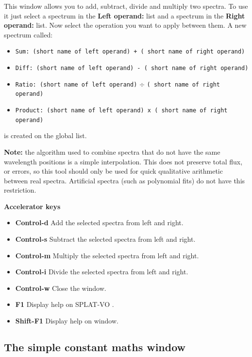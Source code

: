 \documentclass[twoside,11pt,nolof]{starlink}
\providecommand{\SPLAT}{\textsf{SPLAT-VO }}
\newcommand{\labelitem}[1]{\textbf{#1}}
\providecommand{\hitext}[1]{\texttt{#1}}
\providecommand{\subheading}[1]{\textbf{\large{#1}}}
\begin{document}
This window allows you to add, subtract, divide and multiply two spectra. To
use it just select a spectrum in the
\labelitem{Left operand:} list and a spectrum in the
\labelitem{Right operand:} list. Now select the operation you want to
apply between them. A new spectrum called:
\begin{itemize}
  \item \hitext{Sum: (short name of left operand) + ( short name of
        right operand)}
  \item \hitext{Diff: (short name of left operand) - ( short name of
        right operand)}
  \item \hitext{Ratio: (short name of left operand)} $\div$ \hitext{( short
        name of right operand)}
  \item \hitext{Product: (short name of left operand) x ( short name
        of right operand)}
\end{itemize}
is created on the global list.

\textbf{Note:} the algorithm used to combine spectra that do not have
the same wavelength positions is a simple interpolation. This does not
preserve total flux, or errors, so this tool should only be used for
quick qualitative arithmetic between real spectra. Artificial spectra
(such as polynomial fits) do not have this restriction.

\subheading{Accelerator keys}

\begin{itemize}
\item \labelitem{Control-d} Add the selected spectra from left and right.
\item \labelitem{Control-s} Subtract the selected spectra from left and right.
\item \labelitem{Control-m} Multiply the selected spectra from left and right.
\item \labelitem{Control-i} Divide the selected spectra from left and right.
\item \labelitem{Control-w} Close the window.
\item \labelitem{F1} Display help on \SPLAT.
\item \labelitem{Shift-F1} Display help on window.
\end{itemize}


\newpage
\subsection{The simple constant maths window}
\end{document}
